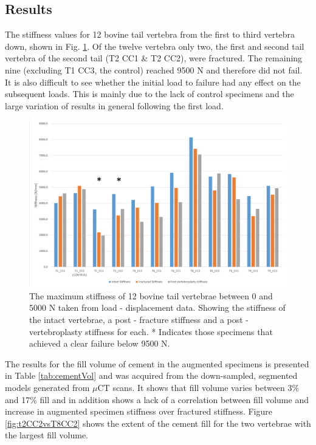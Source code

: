 \subsection{Results}\label{results}

The stiffness values for 12 bovine tail vertebra from the first to third vertebra down, shown in Fig. \ref{fig:allexpData}. Of the twelve vertebra only two, the first and second tail vertebra of the second tail (T2 CC1 \& T2 CC2), were fractured. The remaining nine (excluding T1 CC3, the control) reached 9500 N and therefore did not fail. It is also difficult to see whether the initial load to failure had any effect on the subsequent loads. This is mainly due to the lack of control specimens and the large variation of results in general following the first load.

\begin{figure}[ht!]
\centering
\includegraphics[width=\textwidth]{images/All_experimental_Data.png}
\caption{The maximum stiffness of 12 bovine tail vertebrae between 0 and 5000 N taken from load - displacement data. Showing the stiffness of the intact vertebrae, a post - fracture stiffness and a post - vertebroplasty stiffness for each. * Indicates those specimens that achieved a clear failure below 9500 N.}
\label{fig:allexpData}
\end{figure}

The results for the fill volume of cement in the augmented specimens is presented in Table \ref{tab:cementVol} and was acquired from the down-sampled, segmented models generated from $\mu$CT scans. It shows that fill volume varies between 3\% and 17\% fill and in addition shows a lack of a correlation between fill volume and increase in augmented specimen stiffness over fractured stiffness. Figure \ref{fig:t2CC2vsT8CC2} shows the extent of the cement fill for the two vertebrae with the largest fill volume.

